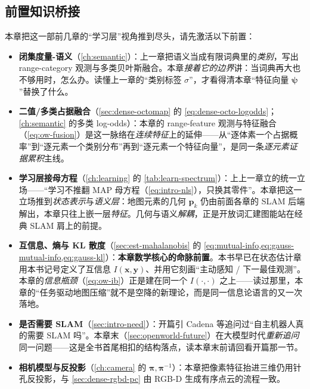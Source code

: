 \subsection*{前置知识桥接}
本章把这一部前几章的“学习层”视角推到尽头，请先激活以下前置：
\begin{itemize}
  \item \textbf{闭集度量-语义}（\cref{ch:semantic}）：上一章把语义当成有限词典里的\emph{类别}，写出 range-category 观测与多类贝叶斯融合。本章\emph{接着它的边界}讲：当词典再大也不够用时，怎么办。读懂上一章的“类别标签 $\sigma$”，才看得清本章“特征向量 $\boldsymbol\psi$”替换了什么。
  \item \textbf{二值/多类占据融合}（\cref{sec:dense-octomap} 的 \cref{eq:dense-octo-logodds}；\cref{ch:semantic} 的多类 log-odds）：本章的 range-feature 观测与特征融合（\cref{eq:ow-fusion}）是这一脉络在\emph{连续特征}上的延伸——从“逐体素一个占据概率”到“逐元素一个类别分布”再到“逐元素一个特征向量”，是同一条\emph{逐元素证据累积}主线。
  \item \textbf{学习层接母方程}（\cref{ch:learning} 的 \cref{tab:learn-spectrum}）：上上一章立的统一立场——“学习不推翻 MAP 母方程（\cref{eq:intro-nls}），只换其零件”。本章把这一立场推到\emph{状态表示}与\emph{语义层}：地图元素的几何 $\mathbf{p}_k$ 仍由前面各章的 SLAM 后端解出，本章只往上嵌一层\emph{特征}。几何与语义\emph{解耦}，正是开放词汇建图能站在经典 SLAM 肩上的前提。
  \item \textbf{互信息、熵与 KL 散度}（\cref{sec:est-mahalanobis} 的 \cref{eq:mutual-info,eq:gauss-mutual-info,eq:gauss-kl}）：\textbf{本章数学核心的命脉前置}。本书早已在状态估计章用本书记号定义了互信息 $I(\mathbf{x},\mathbf{y})$、并用它刻画“主动感知 / 下一最佳观测”。本章的\emph{信息瓶颈}（\cref{eq:ow-ib}）正是建在同一个 $I(\cdot,\cdot)$ 之上——读过那里，本章的“任务驱动地图压缩”就不是空降的新理论，而是同一信息论语言的又一次落地。
  \item \textbf{是否需要 SLAM}（\cref{sec:intro-need}）：开篇引 Cadena 等追问过“自主机器人真的需要 SLAM 吗”。本章末（\cref{sec:openworld-future}）在大模型时代\emph{重新追问}同一问题——这是全书首尾相扣的结构落点，读本章末前请回看开篇那一节。
  \item \textbf{相机模型与反投影}（\cref{ch:camera} 的 $\boldsymbol\pi,\boldsymbol\pi^{-1}$）：本章把像素特征抬进三维仍用针孔反投影，与 \cref{sec:dense-rgbd-pc} 由 RGB-D 生成有序点云的流程一致。
\end{itemize}

